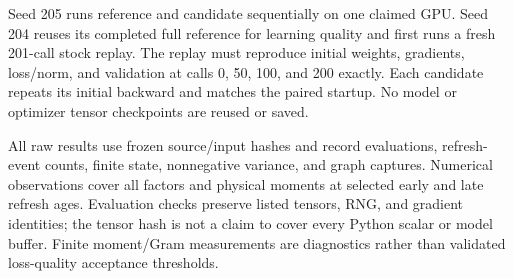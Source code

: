 Seed 205 runs reference and candidate sequentially on one claimed GPU.
Seed 204 reuses its completed full reference for learning quality and
first runs a fresh 201-call stock replay. The replay must reproduce
initial weights, gradients, loss/norm, and validation at calls 0, 50,
100, and 200 exactly. Each candidate repeats its initial backward and
matches the paired startup. No model or optimizer tensor checkpoints are
reused or saved.

All raw results use frozen source/input hashes and record evaluations,
refresh-event counts, finite state, nonnegative variance, and graph
captures. Numerical observations cover all factors and physical moments
at selected early and late refresh ages. Evaluation checks preserve
listed tensors, RNG, and gradient identities; the tensor hash is not a
claim to cover every Python scalar or model buffer. Finite moment/Gram
measurements are diagnostics rather than validated loss-quality
acceptance thresholds.
